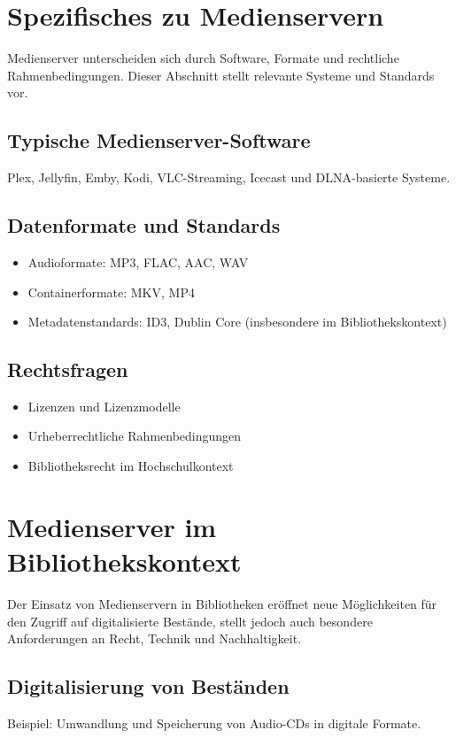 \documentclass[12pt,a4paper]{report}
\begin{document}
\section{Spezifisches zu Medienservern}
Medienserver unterscheiden sich durch Software, Formate und rechtliche Rahmenbedingungen. Dieser Abschnitt stellt relevante Systeme und Standards vor.

  \subsection{Typische Medienserver-Software}
  Plex, Jellyfin, Emby, Kodi, VLC-Streaming, Icecast und DLNA-basierte Systeme.

  \subsection{Datenformate und Standards}
\begin{itemize}
    \item Audioformate: MP3, FLAC, AAC, WAV
    \item Containerformate: MKV, MP4
    \item Metadatenstandards: ID3, Dublin Core (insbesondere im Bibliothekskontext)
\end{itemize}

  \subsection{Rechtsfragen}
    \begin{itemize}
        \item Lizenzen und Lizenzmodelle
        \item Urheberrechtliche Rahmenbedingungen
        \item Bibliotheksrecht im Hochschulkontext
    \end{itemize}

\section{Medienserver im Bibliothekskontext}
Der Einsatz von Medienservern in Bibliotheken eröffnet neue Möglichkeiten für den Zugriff auf digitalisierte Bestände, stellt jedoch auch besondere Anforderungen an Recht, Technik und Nachhaltigkeit.

  \subsection{Digitalisierung von Beständen}
  Beispiel: Umwandlung und Speicherung von Audio-CDs in digitale Formate.
\end{document}
